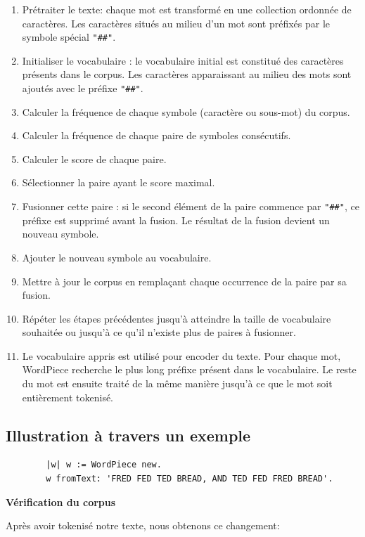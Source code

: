 \documentclass[12pt,a4paper]{report}
\begin{document}
	\begin{enumerate}
		\item Prétraiter le texte: chaque mot est transformé en une collection ordonnée de caractères. Les caractères situés au milieu d'un mot sont préfixés par le symbole spécial \texttt{"\#\#"}.
		\item Initialiser le vocabulaire : le vocabulaire initial est constitué des caractères présents dans le corpus. Les caractères apparaissant au milieu des mots sont ajoutés avec le préfixe \texttt{"\#\#"}.
		\item Calculer la fréquence de chaque symbole (caractère ou sous-mot) du corpus.
		\item Calculer la fréquence de chaque paire de symboles consécutifs.
		\item Calculer le score de chaque paire.
		\item Sélectionner la paire ayant le score maximal.
		\item Fusionner cette paire : si le second élément de la paire commence par \texttt{"\#\#"}, ce préfixe est supprimé avant la fusion. Le résultat de la fusion devient un nouveau symbole.
		\item Ajouter le nouveau symbole au vocabulaire.
		\item Mettre à jour le corpus en remplaçant chaque occurrence de la paire par sa fusion.
		\item Répéter les étapes précédentes jusqu’à atteindre la taille de vocabulaire souhaitée ou jusqu’à ce qu’il n’existe plus de paires à fusionner.
		\item Le vocabulaire appris est utilisé pour encoder du texte. Pour chaque mot, WordPiece recherche le plus long préfixe présent dans le vocabulaire. Le reste du mot est ensuite traité de la même manière jusqu’à ce que le mot soit entièrement tokenisé.
	\end{enumerate}
	
	\subsection{Illustration à travers un exemple}
	
	\begin{verbatim}
		|w| w := WordPiece new. 
		w fromText: 'FRED FED TED BREAD, AND TED FED FRED BREAD'.
	\end{verbatim}
	
	\textbf{Vérification du corpus}
	
	Après avoir tokenisé notre texte, nous obtenons ce changement:
	
\end{document}
